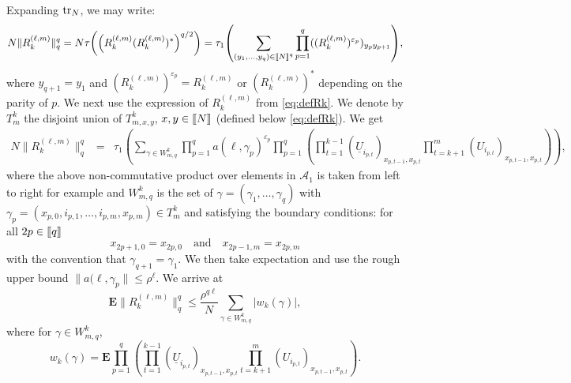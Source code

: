 \documentclass[11pt]{article}
\newcommand{\cA}{\mathcal{A}}
\newcommand{\tr}{{\rm tr}}
\newcommand{\dE}{\mathbf {E}}
\newcommand{\PAR}[1]{{{\left(#1\right)}}} %
\newcommand{\AND}{\quad \mathrm{and} \quad}
\newcommand{\1}{1\!\!{\sf I}}
\newcommand{\veps}{\varepsilon}
\newcommand{\INT}[1]{{{\left[\hspace{-1.4pt}\left[#1\right]\hspace{-1.4pt}\right]}}}
\begin{document}
Expanding $\tr_N$, we may write: 
\begin{eqnarray*}
N \| R_k^{(\ell,m)} \|_{q}^{q}  = N \tau \PAR{ \PAR{ R_k^{(\ell,m)} (R_k^{(\ell,m)})^* }^{q/2}}  = \tau_1 \PAR{ \sum_{( y_1,\ldots, y_{q}) \in \INT{N}^{q}}   \prod_{p =1}^{q} ( (R_k^{(\ell,m)})^{\veps_p} )_{y_{p} y_{p+1}} },
 \end{eqnarray*}
 where  $y_{q+1} = y_1$ and $(R_k^{(\ell,m)})^{\veps_p} = R_k^{(\ell,m)}$  or $(R_k^{(\ell,m)})^{*}$ depending on the parity of $p$.  We next use the expression of $R^{(\ell,m)}_k$ from \eqref{eq:defRk}. We denote by $T^k_{m}$ the disjoint union of $T^k_{m,x,y}$, $x,y \in \INT{N}$ (defined below \eqref{eq:defRk}). We get
 \begin{eqnarray*}
N \| R_k^{(\ell,m)} \|_{q}^{q}  & =  &   \tau_1 \PAR{ \sum_{\gamma \in W^k_{m,q}} \prod_{p=1}^{q}  a(\ell,\gamma_p )^{\veps_p} \prod_{p=1}^{q} \PAR{ \prod_{t=1}^{k-1} (\underline U_{i_{p,t}} )_{x_{p,t-1},x_{p,t}} \prod_{t=k+1}^m (U_{i_{p,t}} )_{x_{p,t-1},x_{p,t}}   }},
 \end{eqnarray*}
where the above non-commutative product over elements in $\cA_1$ is taken from left to right for example and $W^k_{m,q}$ is the set of $\gamma = (\gamma_1,\ldots, \gamma_q)$ with $\gamma_p = (x_{p,0},i_{p,1},\ldots,i_{p,m},x_{p,m}) \in T^k_m$ and satisfying the boundary conditions: for all $2p \in \INT{q}$
\begin{equation}\label{eq:boundaryR}
x_{2p+1,0} = x_{2p,0} \AND x_{{2p-1},m} = x_{2p,m} 
\end{equation}
with the convention that $\gamma_{q+1} = \gamma_1$. We then take expectation and use the rough upper bound  $ \|  a(\ell,\gamma_p \| \leq \rho^\ell$. We arrive at 
\begin{equation}\label{eq:tr1R}
\dE \| R_k^{(\ell,m)} \|_{q}^{q}  \leq \frac {\rho^{q \ell } }{N} \sum_{\gamma \in W^k_{m,q}}   | w_k(\gamma) |,
\end{equation}
where for $\gamma \in W^k_{m,q}$,
\begin{equation}\label{eq:defapgammaR}
w_k(\gamma) = \dE \prod_{p=1}^{q} \PAR{ \prod_{t=1}^{k-1} (\underline U_{i_{p,t}} )_{x_{p,t-1},x_{p,t}} \prod_{t=k+1}^m (U_{i_{p,t}} )_{x_{p,t-1},x_{p,t}}   }.
\end{equation}
\end{document}
